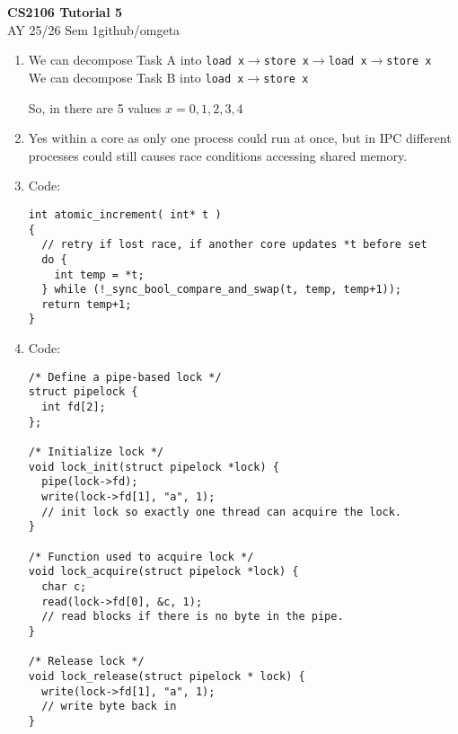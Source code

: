 \documentclass[12pt, a4paper]{article}
\newcommand{\mytitle}{CS2106 Tutorial 5}
\newcommand{\myauthor}{github/omgeta}
\newcommand{\mydate}{AY 25/26 Sem 1}
\begin{document}
\raggedright
\footnotesize
\begin{center}
{\normalsize{\textbf{\mytitle}}} \\
{\footnotesize{\mydate\hspace{2pt}\textemdash\hspace{2pt}\myauthor}}
\end{center}
\begin{enumerate}[Q\arabic*.]
  \item We can decompose Task A into \lstinline|load x|$\rightarrow$\lstinline|store x|$\rightarrow$\lstinline|load x|$\rightarrow$\lstinline|store x|\\
    We can decompose Task B into \lstinline|load x|$\rightarrow$\lstinline|store x|

    So, in there are 5 values $x = 0, 1, 2, 3, 4$

  \item Yes within a core as only one process could run at once, but in IPC different processes could still causes race conditions accessing shared memory. 

  \item Code:
    \begin{lstlisting}
int atomic_increment( int* t )
{ 
  // retry if lost race, if another core updates *t before set 
  do {
    int temp = *t;
  } while (!_sync_bool_compare_and_swap(t, temp, temp+1));
  return temp+1;
}
    \end{lstlisting}

  \item Code:
    \begin{lstlisting}
/* Define a pipe-based lock */
struct pipelock {
  int fd[2];
};

/* Initialize lock */
void lock_init(struct pipelock *lock) {
  pipe(lock->fd);
  write(lock->fd[1], "a", 1);
  // init lock so exactly one thread can acquire the lock.
}

/* Function used to acquire lock */
void lock_acquire(struct pipelock *lock) {
  char c;
  read(lock->fd[0], &c, 1);
  // read blocks if there is no byte in the pipe.
}

/* Release lock */
void lock_release(struct pipelock * lock) {
  write(lock->fd[1], "a", 1);
  // write byte back in
}
    \end{lstlisting}
\end{enumerate}
\end{document}
